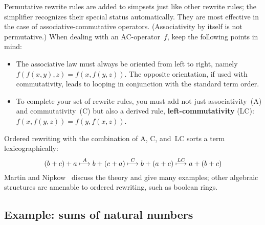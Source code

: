 Permutative rewrite rules are added to simpsets just like other
rewrite rules; the simplifier recognizes their special status
automatically.  They are most effective in the case of
associative-commutative operators.  (Associativity by itself is not
permutative.)  When dealing with an AC-operator~$f$, keep the
following points in mind:
\begin{itemize}
  
\item The associative law must always be oriented from left to right,
  namely $f(f(x,y),z) = f(x,f(y,z))$.  The opposite orientation, if
  used with commutativity, leads to looping in conjunction with the
  standard term order.

\item To complete your set of rewrite rules, you must add not just
  associativity~(A) and commutativity~(C) but also a derived rule, {\bf
    left-com\-mut\-ativ\-ity} (LC): $f(x,f(y,z)) = f(y,f(x,z))$.
\end{itemize}
Ordered rewriting with the combination of A, C, and~LC sorts a term
lexicographically:
\[\def\maps#1{\stackrel{#1}{\longmapsto}}
 (b+c)+a \maps{A} b+(c+a) \maps{C} b+(a+c) \maps{LC} a+(b+c) \]
Martin and Nipkow~\cite{martin-nipkow} discuss the theory and give many
examples; other algebraic structures are amenable to ordered rewriting,
such as boolean rings.

\subsection{Example: sums of natural numbers}

